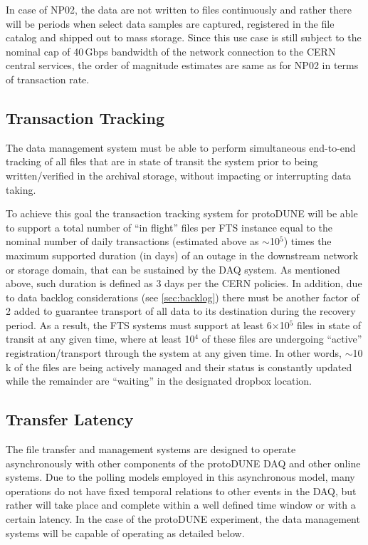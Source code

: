 \documentclass[12pt]{article}
\newcommand{\pd}{protoDUNE\xspace}
\begin{document}
In case of NP02, the data are not written to files continuously and rather there will be periods when
select data samples are captured, registered in the file catalog and shipped out to mass storage.
Since this use case is still subject to the nominal cap of 40\,Gbps bandwidth of the network connection
to the CERN central services, the order of magnitude estimates are same as for NP02 in terms of transaction rate.

\subsection{Transaction Tracking}
The data management system must be able to perform simultaneous end-to-end tracking
of all files that are in state of transit the system prior to being written/verified in the archival storage,
without impacting or interrupting data taking. 

To achieve this goal the transaction tracking system for \pd will be
able to support a total number of ``in flight'' files per FTS instance equal to the nominal number of daily transactions
(estimated above as $\sim$10$^5$) times the maximum supported duration (in days)
of an outage in the downstream network or storage domain, that can be sustained by the DAQ system.
As mentioned above, such duration is defined as 3 days per the CERN policies. In addition, due to data backlog considerations
(see \ref{sec:backlog}) there must be another factor of 2 added to guarantee transport of all data to its destination during
the recovery period. As a result, the FTS systems must support at least 6$\times$10$^5$ files in state of transit at any given time,
where at least 10$^4$ of these files are undergoing ``active'' registration/transport through the system at any given time.
In other words, $\sim$10\,k of the files are being actively
managed and their status is constantly updated while the remainder are ``waiting'' in the designated dropbox location.

\subsection{Transfer Latency}
The file transfer and management systems are designed to operate asynchronously with other components of the \pd DAQ
and other online systems.
Due to the polling models employed in this asynchronous model, many operations do not have fixed temporal relations to other events in the DAQ,
but rather will take place and complete within a well defined time window or with a certain latency.  In the case of the \pd experiment,
the data management systems will be capable of operating as detailed below.
\end{document}
